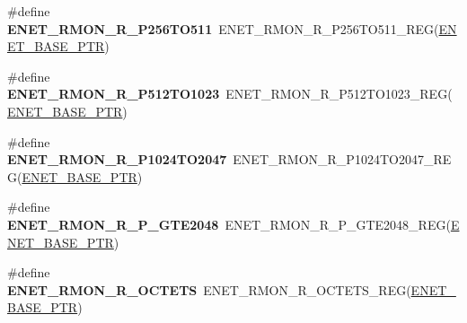 \begin{DoxyCompactItemize}
\item 
\hypertarget{group___e_n_e_t___register___accessor___macros_ga42a4dce30341d5f9b2e76f53c27638c8}{}\#define {\bfseries E\+N\+E\+T\+\_\+\+R\+M\+O\+N\+\_\+\+R\+\_\+\+P256\+T\+O511}~E\+N\+E\+T\+\_\+\+R\+M\+O\+N\+\_\+\+R\+\_\+\+P256\+T\+O511\+\_\+\+R\+E\+G(\hyperlink{group___e_n_e_t___peripheral_gab64a2d991cc2bd76dd55ee25a52dcb5c}{E\+N\+E\+T\+\_\+\+B\+A\+S\+E\+\_\+\+P\+T\+R})\label{group___e_n_e_t___register___accessor___macros_ga42a4dce30341d5f9b2e76f53c27638c8}

\item 
\hypertarget{group___e_n_e_t___register___accessor___macros_ga9c05f6cd159acd6a4c5d0b36b8a41252}{}\#define {\bfseries E\+N\+E\+T\+\_\+\+R\+M\+O\+N\+\_\+\+R\+\_\+\+P512\+T\+O1023}~E\+N\+E\+T\+\_\+\+R\+M\+O\+N\+\_\+\+R\+\_\+\+P512\+T\+O1023\+\_\+\+R\+E\+G(\hyperlink{group___e_n_e_t___peripheral_gab64a2d991cc2bd76dd55ee25a52dcb5c}{E\+N\+E\+T\+\_\+\+B\+A\+S\+E\+\_\+\+P\+T\+R})\label{group___e_n_e_t___register___accessor___macros_ga9c05f6cd159acd6a4c5d0b36b8a41252}

\item 
\hypertarget{group___e_n_e_t___register___accessor___macros_ga99cd39d027b2229cca4fccb4a632c18e}{}\#define {\bfseries E\+N\+E\+T\+\_\+\+R\+M\+O\+N\+\_\+\+R\+\_\+\+P1024\+T\+O2047}~E\+N\+E\+T\+\_\+\+R\+M\+O\+N\+\_\+\+R\+\_\+\+P1024\+T\+O2047\+\_\+\+R\+E\+G(\hyperlink{group___e_n_e_t___peripheral_gab64a2d991cc2bd76dd55ee25a52dcb5c}{E\+N\+E\+T\+\_\+\+B\+A\+S\+E\+\_\+\+P\+T\+R})\label{group___e_n_e_t___register___accessor___macros_ga99cd39d027b2229cca4fccb4a632c18e}

\item 
\hypertarget{group___e_n_e_t___register___accessor___macros_ga56a77b358a36b49a431e33c3c08b95a8}{}\#define {\bfseries E\+N\+E\+T\+\_\+\+R\+M\+O\+N\+\_\+\+R\+\_\+\+P\+\_\+\+G\+T\+E2048}~E\+N\+E\+T\+\_\+\+R\+M\+O\+N\+\_\+\+R\+\_\+\+P\+\_\+\+G\+T\+E2048\+\_\+\+R\+E\+G(\hyperlink{group___e_n_e_t___peripheral_gab64a2d991cc2bd76dd55ee25a52dcb5c}{E\+N\+E\+T\+\_\+\+B\+A\+S\+E\+\_\+\+P\+T\+R})\label{group___e_n_e_t___register___accessor___macros_ga56a77b358a36b49a431e33c3c08b95a8}

\item 
\hypertarget{group___e_n_e_t___register___accessor___macros_gafcac9c606ebecf297e008fa0a7079327}{}\#define {\bfseries E\+N\+E\+T\+\_\+\+R\+M\+O\+N\+\_\+\+R\+\_\+\+O\+C\+T\+E\+T\+S}~E\+N\+E\+T\+\_\+\+R\+M\+O\+N\+\_\+\+R\+\_\+\+O\+C\+T\+E\+T\+S\+\_\+\+R\+E\+G(\hyperlink{group___e_n_e_t___peripheral_gab64a2d991cc2bd76dd55ee25a52dcb5c}{E\+N\+E\+T\+\_\+\+B\+A\+S\+E\+\_\+\+P\+T\+R})\label{group___e_n_e_t___register___accessor___macros_gafcac9c606ebecf297e008fa0a7079327}


\end{DoxyCompactItemize}
